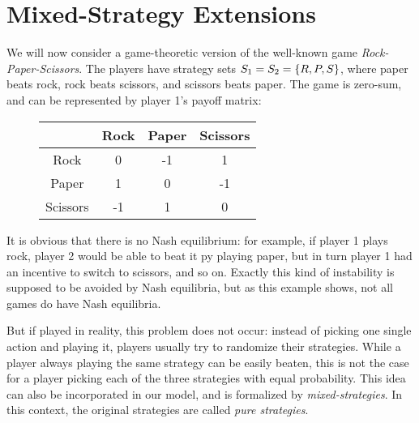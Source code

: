 \documentclass[a4paper]{scrreprt}
\begin{document}
    \section{Mixed-Strategy Extensions}
    
    \begin{ex}
        We will now consider a game-theoretic version of the well-known game \emph{Rock-Paper-Scissors}.
        The players have strategy sets $S_1 = S_2 = \{R, P, S\}$, where paper beats rock, rock beats scissors, and scissors beats paper. The game is zero-sum, and can be represented by player 1's payoff matrix:
        \begin{figure}[h]
            \centering
            \begin{tabular}{c|c|c|c|}
            	         & Rock & Paper & Scissors \\ \hline
            	  Rock   &  0   &  -1   &    1     \\ \hline
            	 Paper   &  1   &   0   &    -1    \\ \hline
            	Scissors &  -1  &   1   &    0     \\ \hline
            \end{tabular}
        \end{figure}
    
        It is obvious that there is no Nash equilibrium: for example, if player 1 plays rock, player 2 would be able to beat it py playing paper, but in turn player 1 had an incentive to switch to scissors, and so on. Exactly this kind of instability is supposed to be avoided by Nash equilibria, but as this example shows, not all games do have Nash equilibria.
        
        But if played in reality, this problem does not occur: instead of picking one single action and playing it, players usually try to randomize their strategies. While a player always playing the same strategy can be easily beaten, this is not the case for a player picking each of the three strategies with equal probability. This idea can also be incorporated in our model, and is formalized by \emph{mixed-strategies}. In this context, the original strategies are called \emph{pure strategies}.
    \end{ex}
\end{document}
